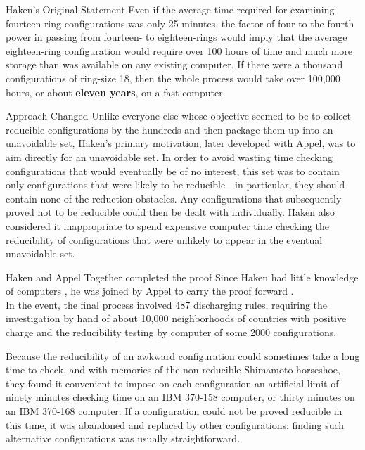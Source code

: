 \documentclass[12pt]{beamer}
\begin{document}
\begin{frame}{Haken's Original Statement}
Even if the average time required for examining fourteen-ring configurations
was only 25 minutes, the factor of four to the fourth power in passing from
fourteen- to eighteen-rings would imply that the average eighteen-ring configuration would require over 100 hours of time and much more storage than was
available on any existing computer. If there were a thousand configurations of
ring-size 18, then the whole process would take over 100,000 hours, or about
\textbf{eleven years}, on a fast computer.
\end{frame}

\begin{frame}{Approach Changed}
Unlike everyone else whose objective seemed to be to collect reducible configurations by the hundreds and then package them up into an unavoidable set, Haken’s primary motivation, later developed with Appel, was to aim
directly for an unavoidable set. In order to avoid wasting time checking configurations that would eventually be of no interest, this set was to contain
only configurations that were likely to be reducible—in particular, they should
contain none of the reduction obstacles. Any configurations that subsequently
proved not to be reducible could then be dealt with individually. Haken also
considered it inappropriate to spend expensive computer time checking the
reducibility of configurations that were unlikely to appear in the eventual
unavoidable set.
\end{frame}

\begin{frame}{Haken and Appel Together completed the proof}
Since Haken had little knowledge of computers , he was joined by Appel to carry the proof forward . \\
In the event, the final process involved
487 discharging rules, requiring the investigation by hand of about 10,000
neighborhoods of countries with positive charge and the reducibility testing
by computer of some 2000 configurations.
\end{frame}

\begin{frame}
Because the reducibility of an awkward configuration could sometimes take
a long time to check, and with memories of the non-reducible Shimamoto
horseshoe, they found it convenient to impose on each configuration an artificial limit of ninety minutes checking time on an IBM 370-158 computer, or
thirty minutes on an IBM 370-168 computer. If a configuration could not be
proved reducible in this time, it was abandoned and replaced by other configurations: finding such alternative configurations was usually straightforward.
\end{frame}
\end{document}
